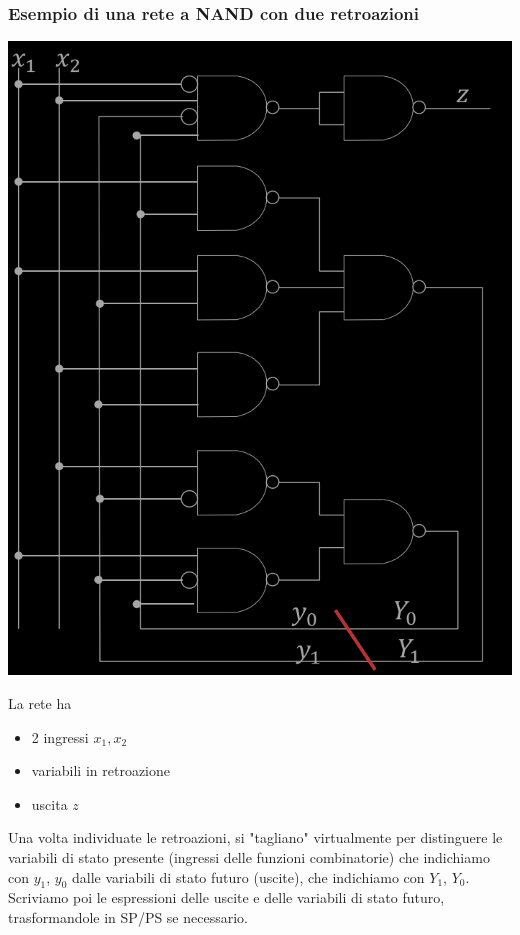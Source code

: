 \documentclass{article}
\begin{document}
\subsubsection{Esempio di una rete a NAND con due retroazioni}
\begin{center}
    \includegraphics[scale=0.5]{nand2retro.png}
\end{center}
La rete ha
\begin{itemize}
    \item 2 ingressi $x_1,x_2$
    \item variabili in retroazione
    \item uscita $z$
\end{itemize}
Una volta individuate le retroazioni, si "tagliano" virtualmente per distinguere le variabili di stato presente (ingressi delle funzioni combinatorie) che indichiamo con $y_1$, $y_0$ dalle variabili di stato futuro (uscite), che indichiamo con $Y_1$, $Y_0$. Scriviamo poi le espressioni delle uscite e delle variabili di stato futuro, trasformandole in SP/PS se necessario.
\end{document}
